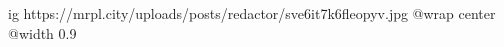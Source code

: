  
 
 
 
 

\ifcmt
  ig https://mrpl.city/uploads/posts/redactor/sve6it7k6fleopyv.jpg
  @wrap center
  @width 0.9
\fi
